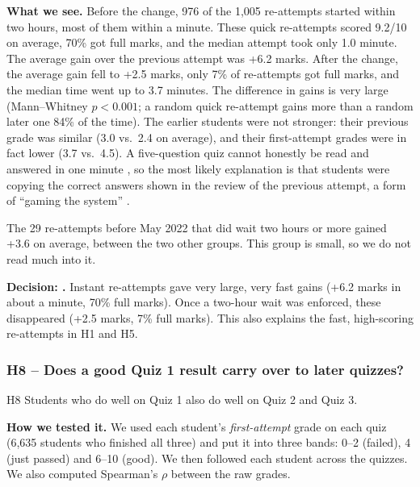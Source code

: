 \textbf{What we see.} Before the change, 976 of the 1,005 re-attempts started
within two hours, most of them within a minute. These quick re-attempts scored
9.2/10 on average, 70\% got full marks, and the median attempt took only 1.0
minute. The average gain over the previous attempt was +6.2 marks. After the
change, the average gain fell to +2.5 marks, only 7\% of re-attempts got full
marks, and the median time went up to 3.7 minutes. The difference in gains is
very large (Mann--Whitney $p < 0.001$; a random quick re-attempt gains more than
a random later one 84\% of the time). The earlier students were not stronger: their
previous grade was similar (3.0 vs.\ 2.4 on average), and their first-attempt
grades were in fact lower (3.7 vs.\ 4.5). A five-question
quiz cannot honestly be read and answered in one minute
\citep{wise2005response}, so the most likely explanation is that students were
copying the correct answers shown in the review of the previous attempt, a form
of ``gaming the system'' \citep{baker2004offtask, alexandron2017copying}.

The 29 re-attempts before May 2022 that did wait two hours or more gained +3.6
on average, between the two other groups. This group is small, so we do not
read much into it.

\begin{decision}
\textbf{Decision: \accepted.} Instant re-attempts gave very large, very fast
gains (+6.2 marks in about a minute, 70\% full marks). Once a two-hour wait was
enforced, these disappeared (+2.5 marks, 7\% full marks). This also explains
the fast, high-scoring re-attempts in H1 and H5.
\end{decision}

\subsubsection{H8 -- Does a good Quiz 1 result carry over to later quizzes?}
\label{sec:h8}

\begin{hyp}{H8}
Students who do well on Quiz 1 also do well on Quiz 2 and Quiz 3.
\end{hyp}

\textbf{How we tested it.} We used each student's \emph{first-attempt} grade on
each quiz (6,635 students who finished all three) and put it into three bands:
0--2 (failed), 4 (just passed) and 6--10 (good). We then followed each student
across the quizzes. We also computed Spearman's $\rho$ between the raw grades.

